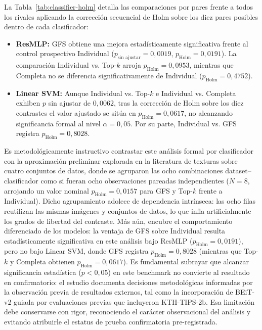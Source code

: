 La Tabla~\ref{tab:classifier-holm} detalla las comparaciones por pares frente a todos los rivales aplicando la corrección secuencial de Holm sobre los diez pares posibles dentro de cada clasificador:
\begin{itemize}
\item \textbf{ResMLP:} GFS obtiene una mejora estadísticamente significativa frente al control prospectivo Individual ($p_{\text{sin ajustar}}=0{,}0019$, $p_{\text{Holm}}=0{,}0191$). La comparación Individual vs. Top-$k$ arroja $p_{\text{Holm}}=0{,}0953$, mientras que Completa no se diferencia significativamente de Individual ($p_{\text{Holm}}=0{,}4752$).
\item \textbf{Linear SVM:} Aunque Individual vs. Top-$k$ e Individual vs. Completa exhiben $p$ sin ajustar de $0{,}0062$, tras la corrección de Holm sobre los diez contrastes el valor ajustado se sitúa en $p_{\text{Holm}}=0{,}0617$, no alcanzando significancia formal al nivel $\alpha=0{,}05$. Por su parte, Individual vs. GFS registra $p_{\text{Holm}}=0{,}8028$.
\end{itemize}

Es metodológicamente instructivo contrastar este análisis formal por clasificador con la aproximación preliminar explorada en la literatura de texturas sobre cuatro conjuntos de datos, donde se agruparon las ocho combinaciones dataset--clasificador como si fueran ocho observaciones pareadas independientes ($N=8$, arrojando un valor nominal $p_{\text{Holm}}=0{,}0157$ para GFS y Top-$k$ frente a Individual). Dicho agrupamiento adolece de dependencia intrínseca: las ocho filas reutilizan las mismas imágenes y conjuntos de datos, lo que infla artificialmente los grados de libertad del contraste. Más aún, encubre el comportamiento diferenciado de los modelos: la ventaja de GFS sobre Individual resulta estadísticamente significativa en este análisis bajo ResMLP ($p_{\text{Holm}}=0{,}0191$), pero no bajo Linear SVM, donde GFS registra $p_{\text{Holm}}=0{,}8028$ (mientras que Top-$k$ y Completa obtienen $p_{\text{Holm}}=0{,}0617$). Es fundamental subrayar que alcanzar significancia estadística ($p<0{,}05$) en este benchmark no convierte al resultado en confirmatorio: el estudio documenta decisiones metodológicas informadas por la observación previa de resultados externos, tal como la incorporación de BEiT-v2 guiada por evaluaciones previas que incluyeron KTH-TIPS-2b. Esa limitación debe conservarse con rigor, reconociendo el carácter observacional del análisis y evitando atribuirle el estatus de prueba confirmatoria pre-registrada.

